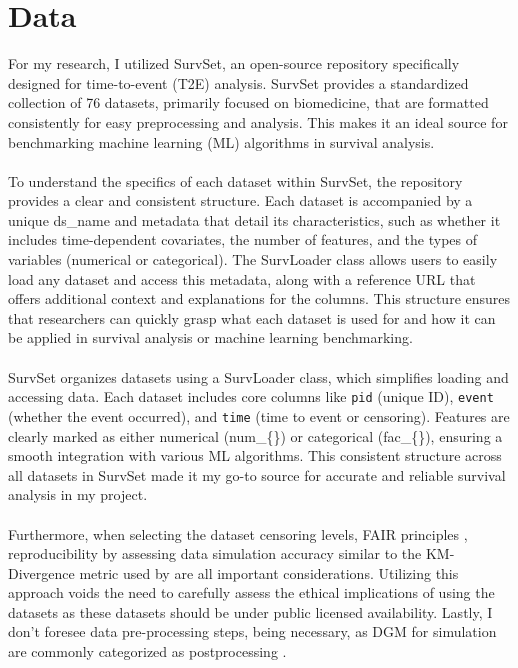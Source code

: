 \section{Data}
\noindent For my research, I utilized SurvSet, an open-source repository specifically designed for time-to-event (T2E) analysis. SurvSet provides a standardized collection of 76 datasets, primarily focused on biomedicine, that are formatted consistently for easy preprocessing and analysis. This makes it an ideal source for benchmarking machine learning (ML) algorithms in survival analysis.
\\\\
\noindent To understand the specifics of each dataset within SurvSet, the repository provides a clear and consistent structure. Each dataset is accompanied by a unique ds\_name and metadata that detail its characteristics, such as whether it includes time-dependent covariates, the number of features, and the types of variables (numerical or categorical). The SurvLoader class allows users to easily load any dataset and access this metadata, along with a reference URL that offers additional context and explanations for the columns. This structure ensures that researchers can quickly grasp what each dataset is used for and how it can be applied in survival analysis or machine learning benchmarking.
\\\\
\noindent SurvSet organizes datasets using a SurvLoader class, which simplifies loading and accessing data. Each dataset includes core columns like \texttt{pid} (unique ID), \texttt{event} (whether the event occurred), and \texttt{time} (time to event or censoring). Features are clearly marked as either numerical (num\_\{\}) or categorical (fac\_\{\}), ensuring a smooth integration with various ML algorithms. This consistent structure across all datasets in SurvSet made it my go-to source for accurate and reliable survival analysis in my project.
\\\\
\noindent Furthermore, when selecting the dataset censoring levels, FAIR principles \parencite{wilkinson_fair_2016}, reproducibility by assessing data simulation accuracy similar to the KM-Divergence metric used by \parencite{norcliffe_survivalgan_2023} are all important considerations. Utilizing this approach voids the need to carefully assess the ethical implications of using the datasets as these datasets should be under public licensed availability. Lastly, I don't foresee data pre-processing steps, being necessary, as DGM for simulation are commonly categorized as postprocessing \parencite{jin_imputation_2024}.


